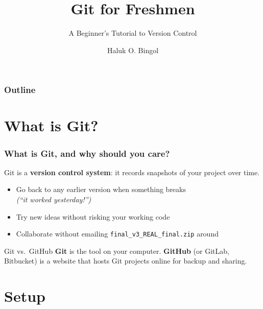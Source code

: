 \documentclass[aspectratio=169,10pt,compress]{beamer}
\title{Git for Freshmen}
\subtitle{A Beginner's Tutorial to Version Control}
\author[Bingol]{Haluk O. Bingol}
\institute[FCIS]{
    Faculty of Computer and Information Sciences\\
    Yeditepe University
}
\date{
	{\tiny \hbTimeStamp}
}
\begin{document}
\begin{frame}[t,fragile]
  \titlepage
\end{frame}

\begin{frame}[t,fragile] \frametitle{Outline}
  \tableofcontents
\end{frame}

\section[Intro]{What is Git?}

\begin{frame}[t,fragile] \frametitle{What is Git, and why should you care?}
  Git is a \textbf{version control system}: it records snapshots of your project over time.

  \vspace{0.5em}
  \begin{itemize}
    \item Go back to any earlier version when something breaks
          \\ \textit{(``it worked yesterday!'')}
    \item Try new ideas without risking your working code
    \item Collaborate without emailing \texttt{final\_v3\_REAL\_final.zip} around
  \end{itemize}

  \vspace{0.5em}
  \begin{block}{Git vs.\ GitHub}
    \textbf{Git} is the tool on your computer.
    \textbf{GitHub} (or GitLab, Bitbucket) is a website that hosts Git projects online
    for backup and sharing.
  \end{block}
\end{frame}

\section[Setup]{Setup}
\end{document}
